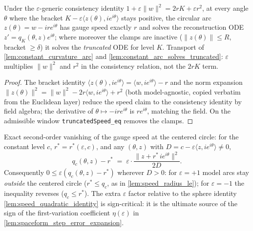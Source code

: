 \begin{lemma}
  \label{lem:spaceform_constant_curvature_arc}
  Under the $\varepsilon$-generic consistency identity
  $1+\varepsilon\|w\|^2=2rK+\varepsilon r^2$, at every angle $\theta$ where
  the bracket $K-\varepsilon\langle z(\theta), ie^{i\theta}\rangle$ stays
  positive, the circular arc $z(\theta)=w-ire^{i\theta}$ has gauge speed
  exactly $r$ and solves the reconstruction ODE
  $z'=q_K(\theta,z)e^{i\theta}$; where moreover the clamps are inactive
  ($\|z(\theta)\|\le R$, bracket $\ge\delta$) it solves the \emph{truncated}
  ODE for level $K$. Transport of \cref{lem:constant_curvature_arc} and
  \cref{lem:constant_arc_solves_truncated}: $\varepsilon$ multiplies
  $\|w\|^2$ and $r^2$ in the consistency relation, not the $2rK$ term.
\end{lemma}

\begin{proof}
  \leanok
  The bracket identity $\langle z(\theta), ie^{i\theta}\rangle=\langle w,
  ie^{i\theta}\rangle-r$ and the norm expansion
  $\|z(\theta)\|^2=\|w\|^2-2r\langle w, ie^{i\theta}\rangle+r^2$ (both
  model-agnostic, copied verbatim from the Euclidean layer) reduce the speed
  claim to the consistency identity by field algebra; the derivative of
  $\theta\mapsto-ire^{i\theta}$ is $re^{i\theta}$, matching the field. On the
  admissible window \texttt{truncatedSpeed\_eq} removes the clamps.
\end{proof}

\begin{lemma}
  \label{lem:spaceform_speed_sub_radius}
  Exact second-order vanishing of the gauge speed at the centered circle:
  for the constant level $c$, $r^\ast=r^\ast(\varepsilon,c)$, and any
  $(\theta,z)$ with $D=c-\varepsilon\langle z, ie^{i\theta}\rangle\ne0$,
  \[
    q_c(\theta,z)-r^\ast
    \;=\;\varepsilon\cdot
    \frac{\|z+r^\ast\, ie^{i\theta}\|^2}{2D}.
  \]
  Consequently $0\le\varepsilon(q_c(\theta,z)-r^\ast)$ wherever $D>0$: for
  $\varepsilon=+1$ model arcs stay \emph{outside} the centered circle
  ($r^\ast\le q_c$, as in \cref{lem:speed_radius_le}); for $\varepsilon=-1$
  the inequality reverses ($q_c\le r^\ast$). The extra $\varepsilon$ factor
  relative to the sphere identity \cref{lem:speed_quadratic_identity} is
  sign-critical: it is the ultimate source of the sign of the
  first-variation coefficient $\eta(\varepsilon)$ in
  \cref{lem:spaceform_step_error_expansion}.
\end{lemma}

